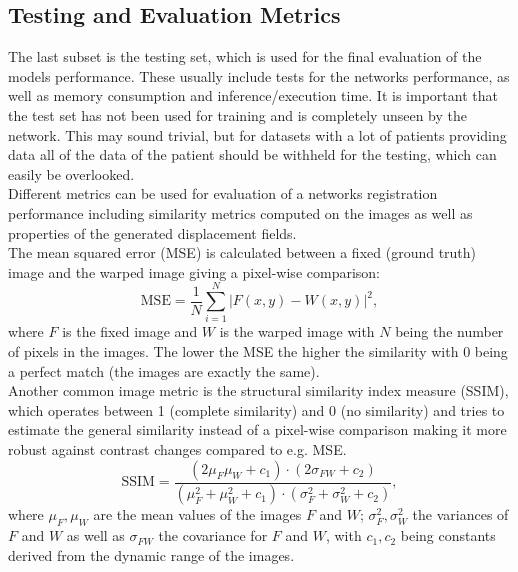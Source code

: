 \documentclass[english,version-2022-01]{uzl-thesis} %
\begin{document}
\subsection{Testing and Evaluation Metrics} \label{SubSec:TestingEvalutionMetrics}
The last subset is the testing set, which is used for the final evaluation of the models performance. These usually include tests for the networks performance, as well as memory consumption and inference/execution time. It is important that the test set has not been used for training and is completely unseen by the network. This may sound trivial, but for datasets with a lot of patients providing data all of the data of the patient should be withheld for the testing, which can easily be overlooked.\\
Different metrics can be used for evaluation of a networks registration performance including similarity metrics computed on the images as well as properties of the generated displacement fields. \\
The mean squared error (MSE) is calculated between a fixed (ground truth) image and the warped image giving a pixel-wise comparison:
\begin{equation}
	\text{MSE} = \frac{1}{N} \sum_{i=1}^{N} |F(x,y) - W(x,y)|^2,
\end{equation}
where $F$ is the fixed image and $W$ is the warped image with $N$ being the number of pixels in the images. The lower the MSE the higher the similarity with 0 being a perfect match (the images are exactly the same).\\
Another common image metric is the structural similarity index measure (SSIM), which operates between 1 (complete similarity) and 0 (no similarity) and tries to estimate the general similarity instead of a pixel-wise comparison making it more robust against contrast changes compared to e.g. MSE.
\begin{equation}
	\text{SSIM} = \frac{(2 \mu_F \mu_W + c_1) \cdot (2 \sigma_{FW} + c_2)}{(\mu_F^2 + \mu_W^2 + c_1) \cdot (\sigma_F^2 + \sigma_W^2 + c_2) },
\end{equation}
where $\mu_F, \mu_W$ are the mean values of the images $F$ and $W$; $\sigma_F^2, \sigma_W^2$ the variances of $F$ and $W$ as well as $\sigma_{FW}$ the covariance for $F$ and $W$, with $c_1, c_2$ being constants derived from the dynamic range of the images. \\
\end{document}

